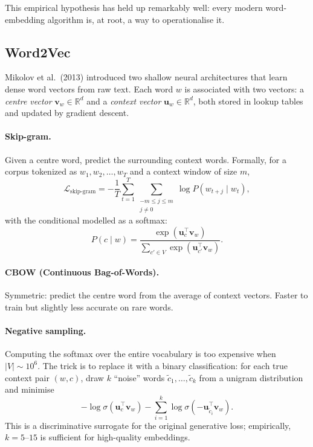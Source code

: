 \documentclass[12pt,a4paper]{report}
\theoremstyle{definition}
\theoremstyle{remark}
\begin{document}
This empirical hypothesis has held up remarkably well: every modern word-embedding algorithm is, at root, a way to operationalise it.

\subsection{Word2Vec}

Mikolov et al.\ (2013) introduced two shallow neural architectures that learn dense word vectors from raw text. Each word $w$ is associated with two vectors: a \emph{centre vector} $\mathbf{v}_w \in \mathbb{R}^d$ and a \emph{context vector} $\mathbf{u}_w \in \mathbb{R}^d$, both stored in lookup tables and updated by gradient descent.

\paragraph{Skip-gram.} Given a centre word, predict the surrounding context words. Formally, for a corpus tokenized as $w_1, w_2, \dots, w_T$ and a context window of size $m$,
\[ \mathcal{L}_{\text{skip-gram}} = -\frac{1}{T}\sum_{t=1}^{T}\sum_{\substack{-m \le j \le m \\ j \neq 0}} \log P(w_{t+j} \mid w_t), \]
with the conditional modelled as a softmax:
\[ P(c \mid w) = \frac{\exp(\mathbf{u}_c^\top \mathbf{v}_w)}{\sum_{c' \in V} \exp(\mathbf{u}_{c'}^\top \mathbf{v}_w)}. \]

\paragraph{CBOW (Continuous Bag-of-Words).} Symmetric: predict the centre word from the average of context vectors. Faster to train but slightly less accurate on rare words.

\paragraph{Negative sampling.} Computing the softmax over the entire vocabulary is too expensive when $|V| \sim 10^6$. The trick is to replace it with a binary classification: for each true context pair $(w, c)$, draw $k$ ``noise'' words $\tilde{c}_1, \dots, \tilde{c}_k$ from a unigram distribution and minimise
\[ -\log \sigma(\mathbf{u}_c^\top \mathbf{v}_w) - \sum_{i=1}^{k} \log \sigma(-\mathbf{u}_{\tilde{c}_i}^\top \mathbf{v}_w). \]
This is a discriminative surrogate for the original generative loss; empirically, $k = 5$--$15$ is sufficient for high-quality embeddings.
\end{document}

